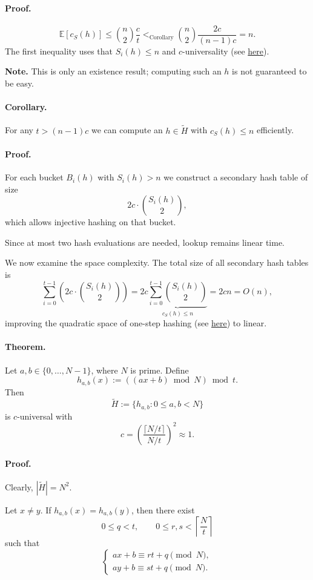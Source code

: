 \documentclass{article}
\begin{document}
\paragraph{Proof.}
\[
\mathbb{E}[c_S(h)]
   \le \binom{n}{2} \frac{c}{t}
   <_{\text{Corollary}}
   \binom{n}{2} \frac{2c}{(n-1)c}
   = n.
\]
The first inequality uses that \(S_i(h) \le n\) and \(c\)-universality (see \hyperref[subsub:cuni]{here}).

\textbf{Note.}
This is only an existence result; computing such an \(h\) is not guaranteed to be easy.

\paragraph{Corollary.}
For any \(t > (n-1)c\) we can compute an \(h \in \tilde{H}\) with \(c_S(h) \le n\) efficiently.

\paragraph{Proof.}
For each bucket \(B_i(h)\) with \(S_i(h) > n\) we construct a secondary hash table of size
\[
2c \cdot \binom{S_i(h)}{2},
\]
which allows injective hashing on that bucket.

Since at most two hash evaluations are needed, lookup remains linear time.

We now examine the space complexity.  
The total size of all secondary hash tables is
\[
\sum_{i=0}^{t-1}
  \left( 2c \cdot \binom{S_i(h)}{2} \right)
  = 2c \underbrace{
      \sum_{i=0}^{t-1} \binom{S_i(h)}{2}
    }_{c_S(h) \le n}
  = 2cn
  = O(n),
\]
improving the quadratic space of one-step hashing  
(see \hyperref[par:quadraticspacehashing]{here}) to linear.

\paragraph{Theorem.}
Let \(a,b \in \{0,\dots,N-1\}\), where \(N\) is prime. Define
\[
h_{a,b}(x) := ((ax + b) \bmod N) \bmod t.
\]
Then
\[
\tilde{H} := \{ h_{a,b} : 0 \le a,b < N \}
\]
is \(c\)-universal with
\[
c = \left( \frac{\lceil N/t \rceil}{N/t} \right)^2 \approx 1.
\]

\paragraph{Proof.}
Clearly, \(|\tilde{H}| = N^2\).

Let \(x \neq y\).  
If \(h_{a,b}(x) = h_{a,b}(y)\), then there exist
\[
0 \le q < t, \qquad 0 \le r,s < \left\lceil \frac{N}{t} \right\rceil
\]
such that
\[
\begin{cases}
ax + b \equiv rt + q \pmod{N}, \\
ay + b \equiv st + q \pmod{N}.
\end{cases}
\]
\end{document}
